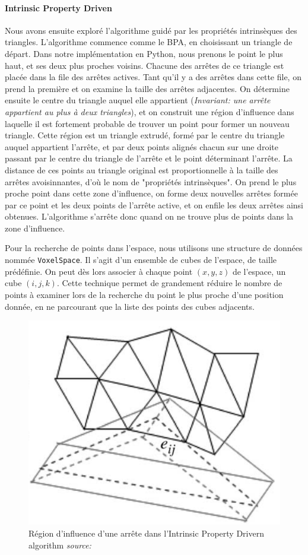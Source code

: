 \documentclass[a4paper,10pt]{report}
\begin{document}
\paragraph{Intrinsic Property Driven}\label{Intrinsic}
Nous avons ensuite exploré l'algorithme guidé par les propriétés intrinsèques des triangles\cite{IPD}. L'algorithme commence comme le BPA, en choisissant un triangle de départ. Dans notre implémentation en Python, nous prenons le point le plus haut, et ses deux plus proches voisins. Chacune des arrêtes de ce triangle est placée dans la file des arrêtes actives. Tant qu'il y a des arrêtes dans cette file, on prend la première et on examine la taille des arrêtes adjacentes. On détermine ensuite le centre du triangle auquel elle appartient (\textit{Invariant: une arrête appartient au plus à deux triangles}), et on construit une région d'influence dans laquelle il est fortement probable de trouver un point pour former un nouveau triangle. Cette région est un triangle extrudé, formé par le centre du triangle auquel appartient l'arrête, et par deux points alignés chacun sur une droite passant par le centre du triangle de l'arrête et le point déterminant l'arrête. La distance de ces points au triangle original est proportionnelle à la taille des arrêtes avoisinnantes, d'où le nom de "propriétés intrinsèques". On prend le plus proche point dans cette zone d'influence, on forme deux nouvelles arrêtes formée par ce point et les deux points de l'arrête active, et on enfile les deux arrêtes ainsi obtenues. L'algorithme s'arrête donc quand on ne trouve plus de points dans la zone d'influence.

Pour la recherche de points dans l'espace, nous utilisons une structure de données nommée \texttt{VoxelSpace}. Il s'agit d'un ensemble de cubes de l'espace, de taille prédéfinie. On peut dès lors associer à chaque point $(x, y, z)$ de l'espace, un cube $(i, j, k)$. Cette technique permet de grandement réduire le nombre de points à examiner lors de la recherche du point le plus proche d'une position donnée, en ne parcourant que la liste des points des cubes adjacents. 

\begin{figure}[h]
	\centering
    \includegraphics[width=.5\textwidth]{ipd-region.png}
    \caption{\label{fig:ipd-region} Région d'influence d'une arrête dans l'Intrinsic Property Drivern algorithm \textit{source: \cite{IPD}}}
\end{figure}
\end{document}
